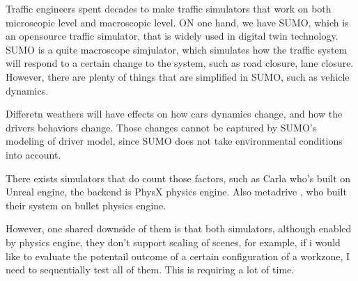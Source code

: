 Traffic engineers spent decades to make traffic simulators that work on both microscopic level and macroscopic level. ON one hand, we have SUMO, which is an opensource traffic simulator, that is widely used in digital twin technology. SUMO is a quite macroscope simjulator, which simulates how the traffic system will respond to a certain change to the system, such as road closure, lane closure. However, there are plenty of things that are simplified in SUMO, such as vehicle dynamics.
%

Differetn weathers will have effects on how cars dynamics change, and how the drivers behaviors change. Those changes cannot be captured by SUMO's modeling of driver model, since SUMO does not take environmental conditions into account.
%

There exists simulators that do count those factors, such as Carla \cite{dosovitskiy_carla_2017} who's built on Unreal engine, the backend is PhysX physics engine. Also metadrive \cite{li_metadrive_2022}, who built their system on bullet physics engine.
%

However, one shared downside of them is that both simulators, although enabled by physics engine, they don't support scaling of scenes, for example, if i would like to evaluate the potentail outcome of a certain configuration of a workzone, I need to sequentially test all of them. This is requiring a lot of time.
%

